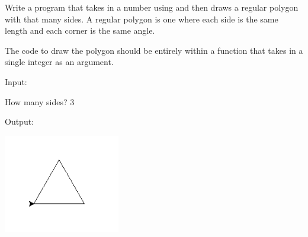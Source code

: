 \documentclass[11pt]{cselabheader}
\begin{document}
{  \begin{ex}[polygons2.py] Write a program that takes in a number using
     and then draws a regular polygon with that many sides. A
    regular polygon is one where each side is the same length and each corner is
    the same angle.

    The code to draw the polygon should be entirely within a function that takes
    in a single integer as an argument.

    Input:

    \begin{verbatimcode}
How many sides? 3
    \end{verbatimcode}

    Output:
    \begin{center}
      \includegraphics[width=2.0in]{img/triangle}
    \end{center}
\end{ex}

%
%
%
%

}
\end{document}
